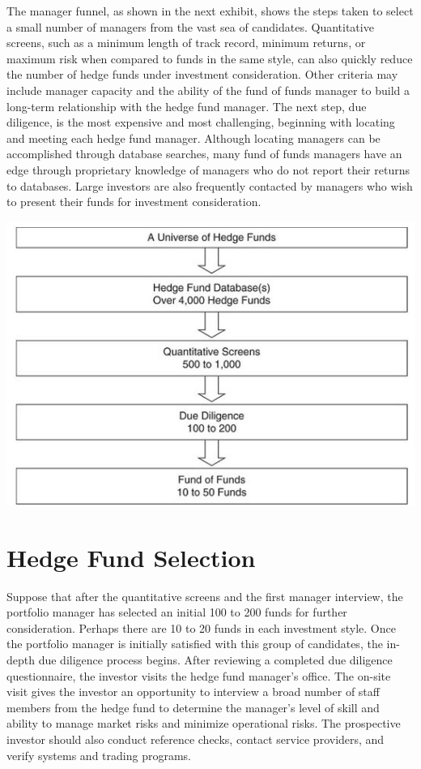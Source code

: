 \documentclass[11pt]{article}
\begin{document}
The manager funnel, as shown in the next exhibit, shows the steps taken to select a small number of managers from the vast sea of candidates. Quantitative screens, such as a minimum length of track record, minimum returns, or maximum risk when compared to funds in the same style, can also quickly reduce the number of hedge funds under investment consideration. Other criteria may include manager capacity and the ability of the fund of funds manager to build a long-term relationship with the hedge fund manager. The next step, due diligence, is the most expensive and most challenging, beginning with locating and meeting each hedge fund manager. Although locating managers can be accomplished through database searches, many fund of funds managers have an edge through proprietary knowledge of managers who do not report their returns to databases. Large investors are also frequently contacted by managers who wish to present their funds for investment consideration.

\begin{center}
\includegraphics[max width=\textwidth]{2024_04_09_a22e8e8765db4383bf63g-6}
\end{center}

\section*{Hedge Fund Selection}
Suppose that after the quantitative screens and the first manager interview, the portfolio manager has selected an initial 100 to 200 funds for further consideration. Perhaps there are 10 to 20 funds in each investment style. Once the portfolio manager is initially satisfied with this group of candidates, the in-depth due diligence process begins. After reviewing a completed due diligence questionnaire, the investor visits the hedge fund manager's office. The on-site visit gives the investor an opportunity to interview a broad number of staff members from the hedge fund to determine the manager's level of skill and ability to manage market risks and minimize operational risks. The prospective investor should also conduct reference checks, contact service providers, and verify systems and trading programs.
\end{document}
